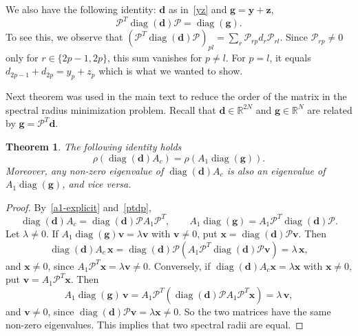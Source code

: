 \documentclass[11pt]{article}
\theoremstyle{plain}
\newtheorem{theorem}{Theorem}[section]
\theoremstyle{definition}
\theoremstyle{remark}
\numberwithin{equation}{section}
\numberwithin{figure}{section}
\numberwithin{table}{section}
\begin{document}
We also have the following identity: $\bm d$ as in~\eqref{yz} and $\bm g=\bm y+\bm z$,
\begin{equation}\label{ptdp}
\mathscr{P}^T\operatorname{diag}(\bm d)\mathscr{P}=\operatorname{diag}(\bm g).
\end{equation}
To see this, 
we observe that 
$\left(\mathscr{P}^T\operatorname{diag}(\bm d)\mathscr{P}\right)_{pl}
=\sum_{r}\mathscr{P}_{rp}d_r\mathscr{P}_{rl}$. Since $\mathscr{P}_{rp}\neq 0$ only
for $r\in\{2p-1,2p\}$, this sum vanishes for $p\neq l$. For $p=l$, it equals $d_{2p-1}+d_{2p}=y_p+z_p$ which is what we wanted to show.

Next theorem was used in the main text to reduce the order of the matrix in the spectral radius minimization problem.
Recall that $\bm d\in\mathbb{R}^{2N}$ and $\bm g\in\mathbb{R}^{N}$ are related by $\bm g=\mathscr{P}^T\bm d$.
\begin{theorem}\label{reduction}
The following identity holds
\begin{equation}
\rho\left(\operatorname{diag}(\bm d)A_c\right)=\rho\left(A_1\operatorname{diag}(\bm g)\right).
\end{equation}
Moreover, any non-zero eigenvalue of $\operatorname{diag}(\bm d)A_c$ is also an
eigenvalue of $A_1\operatorname{diag}(\bm g)$, and vice versa.
\end{theorem}
\begin{proof}
By~\eqref{a1-explicit} and~\eqref{ptdp},
\begin{equation}\label{two-products}
\operatorname{diag}(\bm d)A_c=\operatorname{diag}(\bm d)\mathscr{P}A_1\mathscr{P}^T,
\qquad
A_1\operatorname{diag}(\bm g)=A_1\mathscr{P}^T\operatorname{diag}(\bm d)\mathscr{P}.
\end{equation}
Let $\lambda\neq 0$. If $A_1\operatorname{diag}(\bm g)\bm v=\lambda\bm v$ with
$\bm v\neq 0$, put $\bm x=\operatorname{diag}(\bm d)\mathscr{P}\bm v$. Then
\begin{equation}
\operatorname{diag}(\bm d)A_c\,\bm x
=\operatorname{diag}(\bm d)\mathscr{P}\left(A_1\mathscr{P}^T\operatorname{diag}(\bm d)\mathscr{P}\bm v\right)
=\lambda\,\bm x,
\end{equation}
and $\bm x\neq 0$, since $A_1\mathscr{P}^T\bm x=\lambda\bm v\neq 0$.
Conversely, if $\operatorname{diag}(\bm d)A_c\bm x=\lambda\bm x$ with
$\bm x\neq 0$, put $\bm v=A_1\mathscr{P}^T\bm x$. Then
\begin{equation}
A_1\operatorname{diag}(\bm g)\,\bm v
=A_1\mathscr{P}^T\left(\operatorname{diag}(\bm d)\mathscr{P}A_1\mathscr{P}^T\bm x\right)
=\lambda\,\bm v,
\end{equation}
and $\bm v\neq 0$, since $\operatorname{diag}(\bm d)\mathscr{P}\bm v=\lambda\bm x\neq 0$.
So the two matrices have the same non-zero eigenvalues. This implies that two spectral radii are equal.
\end{proof}
\end{document}
